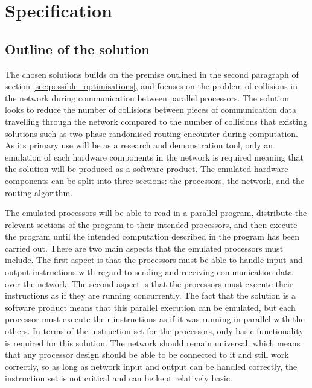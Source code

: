 \documentclass[a4paper, 12pt]{article}
\begin{document}
\newpage
\section{Specification}

\subsection{Outline of the solution}

The chosen solutions builds on the premise outlined in the second paragraph of section \ref{sec:possible_optimisations}, and focuses on the problem of collisions in the network during communication between parallel processors. The solution looks to reduce the number of collisions between pieces of communication data travelling through the network compared to the number of collisions that existing solutions such as two-phase randomised routing encounter during computation. As its primary use will be as a research and demonstration tool, only an emulation of each hardware components in the network is required meaning that the solution will be produced as a software product. The emulated hardware components can be split into three sections: the processors, the network, and the routing algorithm.

The emulated processors will be able to read in a parallel program, distribute the relevant sections of the program to their intended processors, and then execute the program until the intended computation described in the program has been carried out. There are two main aspects that the emulated processors must include. The first aspect is that the processors must be able to handle input and output instructions with regard to sending and receiving communication data over the network. The second aspect is that the processors must execute their instructions as if they are running concurrently. The fact that the solution is a software product means that this parallel execution can be emulated, but each processor must execute their instructions as if it was running in parallel with the others. In terms of the instruction set for the processors, only basic functionality is required for this solution. The network should remain universal, which means that any processor design should be able to be connected to it and still work correctly, so as long as network input and output can be handled correctly, the instruction set is not critical and can be kept relatively basic.   
\end{document}
